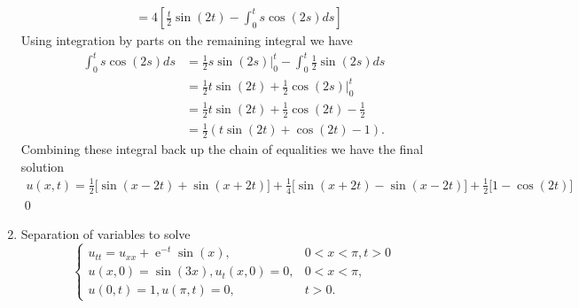 \documentclass[10pt]{amsart}
\DeclareMathOperator{\E}{e}
\theoremstyle{nonumberplain}
\begin{document}
\begin{enumerate}[label={\bf {\arabic*}:}]
\begin{align*}
	&= 4\left[ \frac t 2 \sin (2t) - \int_0^t s \cos (2s) ds \right]
\end{align*}
Using integration by parts on the remaining integral we have
\begin{align*}
\int_0^t s \cos (2s) ds
	&= \frac 1 2 s \sin (2s) \Big|_0^t  - \int_0^t \frac 1 2 \sin (2s) ds \\
	&= \frac 1 2 t \sin (2t)  +  \frac 1 2 \cos (2s) \Big|_0^t \\
	&= \frac 1 2 t \sin (2t)  +  \frac 1 2 \cos (2t) - \frac 1 2 \\
	&= \frac 1 2 \left( t \sin (2t)  +  \cos (2t) - 1 \right).
\end{align*}
Combining these integral back up the chain of equalities we have the final solution
\begin{align*}
u(x, t) = \frac 1 2 \Big[ \sin(x - 2t) + \sin(x + 2t) \Big] + \frac 1 4 \Big[ \sin (x + 2t) - \sin(x - 2t) \Big] + \frac 1 2 \Big[ 1 - \cos (2t) \Big]
\end{align*}
\qed \\


\newpage


\item Separation of variables to solve
$$
\begin{cases}
u_{tt} = u_{xx} + \E^{-t}\sin(x), & 0 < x < \pi, t > 0 \\
u(x, 0) = \sin(3x), u_t(x, 0) = 0, & 0 < x < \pi, \\
u(0, t) = 1, u(\pi, t) = 0, & t > 0.
\end{cases}
$$


\end{enumerate}
\end{document}

